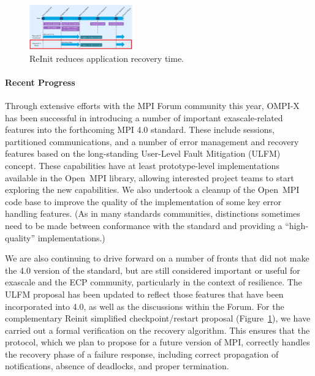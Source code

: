 \begin{figure}
\begin{minipage}[c]{0.33\textwidth}
\end{minipage}
\end{figure}

\begin{figure}
\includegraphics[width=0.40\textwidth]{projects/2.3.1-PMR/2.3.1.17-OMPI-X/reinit.png}
\caption{ReInit reduces application recovery time.}
\label{fig:reinit}
\end{figure}

\paragraph{Recent Progress}
Through extensive efforts with the MPI Forum community this year, OMPI-X has been successful in 
introducing a number of important exascale-related features into the forthcoming MPI 4.0 standard.
These include sessions, partitioned communications, and a number of error management and recovery features
based on the long-standing User-Level Fault Mitigation (ULFM) concept.  These capabilities have at least
prototype-level implementations available in the Open~MPI library, allowing interested project teams to start
exploring the new capabilities.  We also undertook a cleanup of the Open~MPI code base to improve the quality
of the implementation of some key error handling features. (As in many standards communities, distinctions 
sometimes need to be made between conformance with the standard and providing a ``high-quality'' implementations.)

We are also continuing to drive forward on a number of fronts that did not make the 4.0 version of the standard,
but are still considered important or useful for exascale and the ECP community, particularly in the context of resilience. The ULFM
proposal has been updated to reflect those features that have been incorporated into 4.0, as well as the discussions
within the Forum.  For the complementary Reinit simplified checkpoint/restart proposal (Figure~\ref{fig:reinit}), we have carried out a formal verification on the recovery algorithm. 
This ensures that the protocol, which we plan to propose for a future version of MPI, correctly handles the recovery phase 
of a failure response, including correct propagation of notifications, absence of deadlocks, and proper termination.


